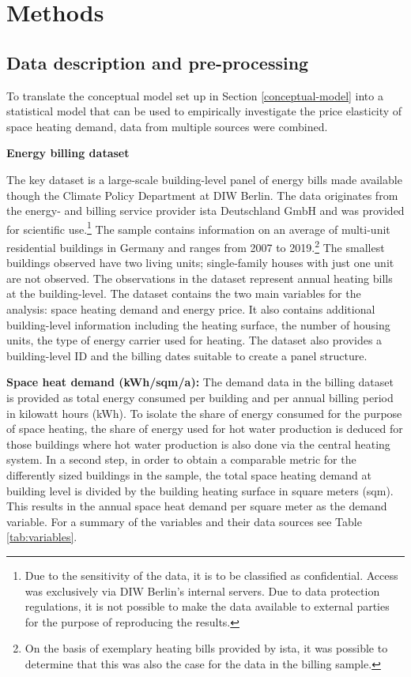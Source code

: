 \documentclass[12pt,twoside]{reedthesis}
\begin{document}
\hypertarget{methods}{%
\chapter{Methods}\label{methods}}

\hypertarget{data}{%
\section{Data description and pre-processing}\label{data}}

To translate the conceptual model set up in Section \ref{conceptual-model} into a statistical model that can be used to empirically investigate the price elasticity of space heating demand, data from multiple sources were combined.

\textbf{Energy billing dataset}

The key dataset is a large-scale building-level panel of energy bills made available though the Climate Policy Department at DIW Berlin. The data originates from the energy- and billing service provider ista Deutschland GmbH and was provided for scientific use.\footnote{Due to the sensitivity of the data, it is to be classified as confidential. Access was exclusively via DIW Berlin's internal servers. Due to data protection regulations, it is not possible to make the data available to external parties for the purpose of reproducing the results.} The sample contains information on an average of multi-unit residential buildings in Germany and ranges from 2007 to 2019.\footnote{On the basis of exemplary heating bills provided by ista, it was possible to determine that this was also the case for the data in the billing sample.} The smallest buildings observed have two living units; single-family houses with just one unit are not observed. The observations in the dataset represent annual heating bills at the building-level. The dataset contains the two main variables for the analysis: space heating demand and energy price. It also contains additional building-level information including the heating surface, the number of housing units, the type of energy carrier used for heating. The dataset also provides a building-level ID and the billing dates suitable to create a panel structure.

\textbf{Space heat demand (kWh/sqm/a):} The demand data in the billing dataset is provided as total energy consumed per building and per annual billing period in kilowatt hours (kWh). To isolate the share of energy consumed for the purpose of space heating, the share of energy used for hot water production is deduced for those buildings where hot water production is also done via the central heating system. In a second step, in order to obtain a comparable metric for the differently sized buildings in the sample, the total space heating demand at building level is divided by the building heating surface in square meters (sqm). This results in the annual space heat demand per square meter as the demand variable. For a summary of the variables and their data sources see Table \ref{tab:variables}.
\end{document}
